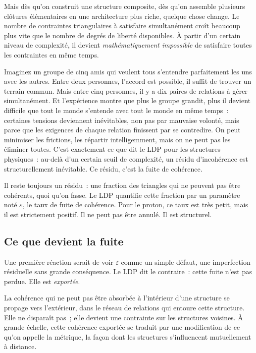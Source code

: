 \documentclass[12pt, a4paper, openright]{book}
\begin{document}
\medskip

Mais dès qu'on construit une structure composite, dès qu'on assemble plusieurs clôtures élémentaires en une architecture plus riche, quelque chose change. Le nombre de contraintes triangulaires à satisfaire simultanément croît beaucoup plus vite que le nombre de degrés de liberté disponibles. À partir d'un certain niveau de complexité, il devient \emph{mathématiquement impossible} de satisfaire toutes les contraintes en même temps.

\medskip

Imaginez un groupe de cinq amis qui veulent tous s'entendre parfaitement les uns avec les autres. Entre deux personnes, l'accord est possible, il suffit de trouver un terrain commun. Mais entre cinq personnes, il y a dix paires de relations à gérer simultanément. Et l'expérience montre que plus le groupe grandit, plus il devient difficile que tout le monde s'entende avec tout le monde en même temps~: certaines tensions deviennent inévitables, non pas par mauvaise volonté, mais parce que les exigences de chaque relation finissent par se contredire. On peut minimiser les frictions, les répartir intelligemment, mais on ne peut pas les éliminer toutes. C'est exactement ce que dit le LDP pour les structures physiques~: au-delà d'un certain seuil de complexité, un résidu d'incohérence est structurellement inévitable. Ce résidu, c'est la fuite de cohérence.

\medskip

Il reste toujours un résidu~: une fraction des triangles qui ne peuvent pas être cohérents, quoi qu'on fasse. Le LDP quantifie cette fraction par un paramètre noté $\varepsilon$, le taux de fuite de cohérence. Pour le proton, ce taux est très petit, mais il est strictement positif. Il ne peut pas être annulé. Il est structurel.

\subsection*{Ce que devient la fuite}

Une première réaction serait de voir $\varepsilon$ comme un simple défaut, une imperfection résiduelle sans grande conséquence. Le LDP dit le contraire~: cette fuite n'est pas perdue. Elle est \emph{exportée}.

\medskip

La cohérence qui ne peut pas être absorbée à l'intérieur d'une structure se propage vers l'extérieur, dans le réseau de relations qui entoure cette structure. Elle ne disparaît pas~; elle devient une contrainte sur les structures voisines. À grande échelle, cette cohérence exportée se traduit par une modification de ce qu'on appelle la métrique, la façon dont les structures s'influencent mutuellement à distance.
\end{document}
